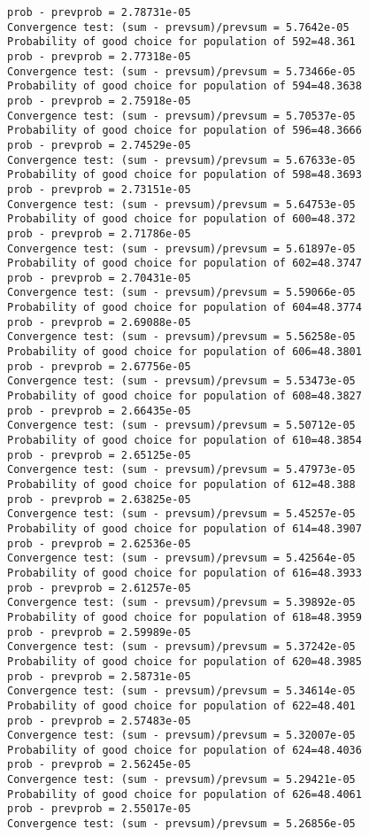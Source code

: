 \documentclass[11pt,onecolumn]{article}
\begin{document}
\begin{verbatim}
prob - prevprob = 2.78731e-05
Convergence test: (sum - prevsum)/prevsum = 5.7642e-05
Probability of good choice for population of 592=48.361
prob - prevprob = 2.77318e-05
Convergence test: (sum - prevsum)/prevsum = 5.73466e-05
Probability of good choice for population of 594=48.3638
prob - prevprob = 2.75918e-05
Convergence test: (sum - prevsum)/prevsum = 5.70537e-05
Probability of good choice for population of 596=48.3666
prob - prevprob = 2.74529e-05
Convergence test: (sum - prevsum)/prevsum = 5.67633e-05
Probability of good choice for population of 598=48.3693
prob - prevprob = 2.73151e-05
Convergence test: (sum - prevsum)/prevsum = 5.64753e-05
Probability of good choice for population of 600=48.372
prob - prevprob = 2.71786e-05
Convergence test: (sum - prevsum)/prevsum = 5.61897e-05
Probability of good choice for population of 602=48.3747
prob - prevprob = 2.70431e-05
Convergence test: (sum - prevsum)/prevsum = 5.59066e-05
Probability of good choice for population of 604=48.3774
prob - prevprob = 2.69088e-05
Convergence test: (sum - prevsum)/prevsum = 5.56258e-05
Probability of good choice for population of 606=48.3801
prob - prevprob = 2.67756e-05
Convergence test: (sum - prevsum)/prevsum = 5.53473e-05
Probability of good choice for population of 608=48.3827
prob - prevprob = 2.66435e-05
Convergence test: (sum - prevsum)/prevsum = 5.50712e-05
Probability of good choice for population of 610=48.3854
prob - prevprob = 2.65125e-05
Convergence test: (sum - prevsum)/prevsum = 5.47973e-05
Probability of good choice for population of 612=48.388
prob - prevprob = 2.63825e-05
Convergence test: (sum - prevsum)/prevsum = 5.45257e-05
Probability of good choice for population of 614=48.3907
prob - prevprob = 2.62536e-05
Convergence test: (sum - prevsum)/prevsum = 5.42564e-05
Probability of good choice for population of 616=48.3933
prob - prevprob = 2.61257e-05
Convergence test: (sum - prevsum)/prevsum = 5.39892e-05
Probability of good choice for population of 618=48.3959
prob - prevprob = 2.59989e-05
Convergence test: (sum - prevsum)/prevsum = 5.37242e-05
Probability of good choice for population of 620=48.3985
prob - prevprob = 2.58731e-05
Convergence test: (sum - prevsum)/prevsum = 5.34614e-05
Probability of good choice for population of 622=48.401
prob - prevprob = 2.57483e-05
Convergence test: (sum - prevsum)/prevsum = 5.32007e-05
Probability of good choice for population of 624=48.4036
prob - prevprob = 2.56245e-05
Convergence test: (sum - prevsum)/prevsum = 5.29421e-05
Probability of good choice for population of 626=48.4061
prob - prevprob = 2.55017e-05
Convergence test: (sum - prevsum)/prevsum = 5.26856e-05

\end{verbatim}
\end{document}
